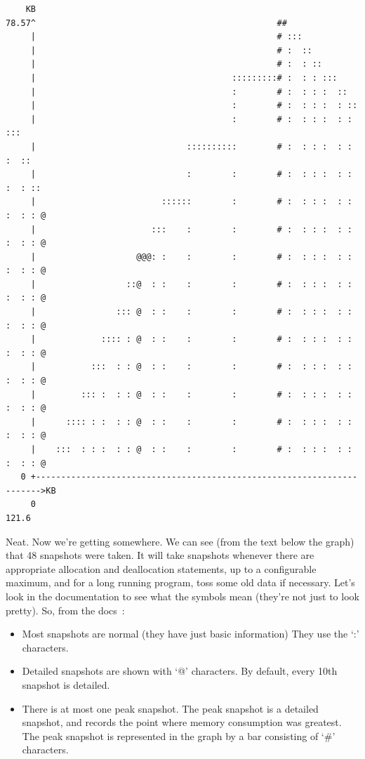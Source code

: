 \documentclass[a4paper]{report}
\begin{document}
{\scriptsize
\begin{verbatim}
    KB
78.57^                                                ##                      
     |                                                # :::                   
     |                                                # :  ::                 
     |                                                # :  : ::               
     |                                       :::::::::# :  : : :::            
     |                                       :        # :  : : :  ::          
     |                                       :        # :  : : :  : ::        
     |                                       :        # :  : : :  : : :::     
     |                              ::::::::::        # :  : : :  : : :  ::   
     |                              :        :        # :  : : :  : : :  : :: 
     |                         ::::::        :        # :  : : :  : : :  : : @
     |                       :::    :        :        # :  : : :  : : :  : : @
     |                    @@@: :    :        :        # :  : : :  : : :  : : @
     |                  ::@  : :    :        :        # :  : : :  : : :  : : @
     |                ::: @  : :    :        :        # :  : : :  : : :  : : @
     |             :::: : @  : :    :        :        # :  : : :  : : :  : : @
     |           :::  : : @  : :    :        :        # :  : : :  : : :  : : @
     |         ::: :  : : @  : :    :        :        # :  : : :  : : :  : : @
     |      :::: : :  : : @  : :    :        :        # :  : : :  : : :  : : @
     |    :::  : : :  : : @  : :    :        :        # :  : : :  : : :  : : @
   0 +----------------------------------------------------------------------->KB
     0                                                                   121.6
\end{verbatim}
}

Neat. Now we're getting somewhere. We can see (from the text below the graph) that 48 snapshots were taken. It will take snapshots whenever there are appropriate allocation and deallocation statements, up to a configurable maximum, and for a long running program, toss some old data if necessary. Let's look in the documentation to see what the symbols mean (they're not just to look pretty). So, from the docs~\cite{massif}:

\begin{itemize}
\item Most snapshots are normal (they have just basic information) They use the `:' characters.

\item Detailed snapshots are shown with `@' characters.  By default, every 10th snapshot is detailed.

\item There is at most one peak snapshot. The peak snapshot is a detailed snapshot, and records the point where memory consumption was greatest. The peak snapshot is represented in the graph by a bar consisting of `\#' characters.
\end{itemize}
\end{document}
